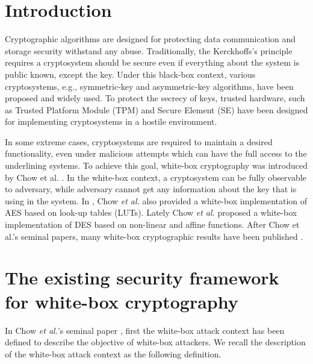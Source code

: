 \documentclass{SCIS2018}
\begin{document}

\maketitle


\section{Introduction}
Cryptographic algorithms are designed for protecting data communication and storage security withstand any abuse. Traditionally, the Kerckhoffs's principle requires a cryptosystem should be secure even if everything about the system is public known, except the key. Under this black-box context, various cryptosystems, e.g., symmetric-key and asymmetric-key algorithms, have been proposed and widely used. To protect the secrecy of keys, trusted hardware, such as Trusted Platform Module (TPM) and Secure Element (SE) have been designed for implementing cryptosystems in a hostile environment.

In some extreme cases, cryptosystems are required to maintain a desired functionality, even under malicious attempts which can have the full access to the underlining systems. To achieve this goal, white-box cryptography was introduced by Chow et al. \cite{DBLP:conf/sacrypt/ChowEJO02}. In the white-box context, a cryptosystem can be fully observable to adversary, while adversary cannot get any information about the key that is using in the system. In \cite{DBLP:conf/sacrypt/ChowEJO02}, Chow \textit{et al.} also provided a white-box implementation of AES based on look-up tables (LUTs). Lately Chow \textit{et al.} \cite{DBLP:conf/ccs/ChowEJO02} proposed a white-box implementation of DES based on non-linear and affine functions. After Chow et al.'s seminal papers, many white-box cryptographic results have been published \cite{DBLP:conf/sacrypt/ChowEJO02,cryptoeprint:2006:468,XiaoLai09,DBLP:conf/asiacrypt/BiryukovBK14}.

\section{The existing security framework for white-box cryptography}
In Chow \textit{et al.}'s seminal paper \cite{DBLP:conf/sacrypt/ChowEJO02}, first the white-box attack context has been defined to describe the objective of white-box attackers. We recall the description of the white-box attack context as the following definition.
\end{document}
